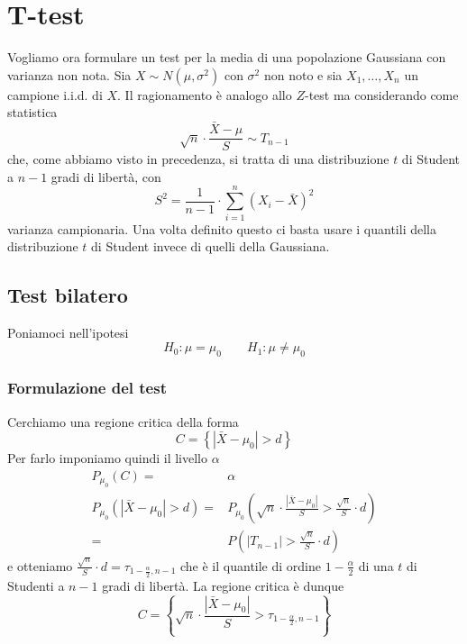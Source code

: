 \section{T-test}
Vogliamo ora formulare un test per la media di una popolazione Gaussiana con varianza non nota. Sia
$X \sim N(\mu, \sigma^2)$ con $\sigma^2$ non noto e sia $X_1, \dots, X_n$ un campione i.i.d. di
$X$. Il ragionamento è analogo allo $Z$-test ma considerando come statistica
\[ \sqrt{n} \cdot \frac{\bar{X} - \mu}{S} \sim T_{n-1} \]
che, come abbiamo visto in precedenza, si tratta di una distribuzione $t$ di Student a $n-1$ gradi
di libertà, con
\[ S^2 = \frac{1}{n-1} \cdot \sum_{i=1}^n \left( X_i - \bar{X} \right)^2 \]
varianza campionaria. Una volta definito questo ci basta usare i quantili della distribuzione $t$
di Student invece di quelli della Gaussiana.

\subsection{Test bilatero}
Poniamoci nell'ipotesi
\[ H_0: \mu = \mu_0 \qquad H_1: \mu \neq \mu_0 \]

\subsubsection{Formulazione del test}
Cerchiamo una regione critica della forma
\[ C = \left\{ |\bar{X} - \mu_0| > d \right\} \]
Per farlo imponiamo quindi il livello $\alpha$
\begin{align*}
	P_{\mu_0} (C) =                     & \alpha \\
	P_{\mu_0} (|\bar{X} - \mu_0| > d) = &
	P_{\mu_0} \left( \sqrt{n} \cdot \frac{|\bar{X} - \mu_0|}{S} >
	\frac{\sqrt{n}}{S} \cdot d \right)           \\
	=                                   &
	P \left( |T_{n-1}| > \frac{\sqrt{n}}{S} \cdot d \right)
\end{align*}
e otteniamo $\frac{\sqrt{n}}{S} \cdot d = \tau_{1 - \frac{\alpha}{2}, n-1}$ che è il quantile di
ordine $1 - \frac{\alpha}{2}$ di una $t$ di Studenti a $n-1$ gradi di libertà. La regione critica
è dunque
\[
	C = \left\{ \sqrt{n} \cdot \frac{|\bar{X} - \mu_0|}{S} >
	\tau_{1 - \frac{\alpha}{2}, n-1} \right\}
\]

